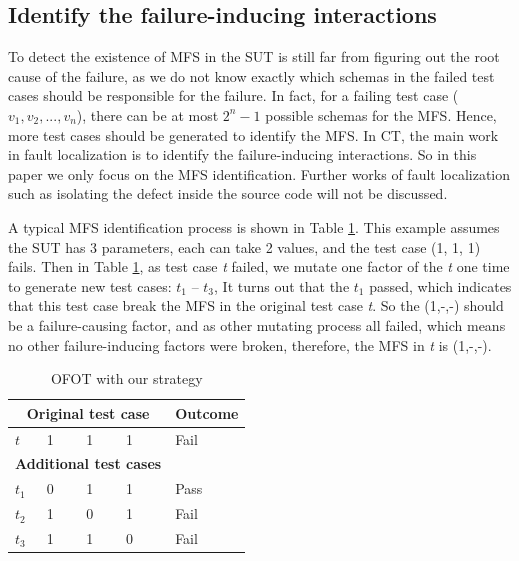 \documentclass{sig-alternate}
\begin{document}
%

%
%
%


\subsection{Identify the failure-inducing interactions}
To detect the existence of MFS in the SUT is still far from figuring out the root cause of the failure, as we do not know exactly which schemas in the failed test cases should be responsible for the failure. In fact, for a failing test case ($v_{1},v_{2},...,v_{n}$), there can be at most $2^{n} - 1$ possible schemas for the MFS. Hence, more test cases should be generated to identify the MFS. In CT, the main work in fault localization is to identify the failure-inducing interactions. So in this paper we only focus on the MFS identification. Further works of fault localization such as isolating the defect inside the source code will not be discussed.

A typical MFS identification process is shown in Table \ref{ofot-identify}. This example assumes the SUT has 3 parameters, each can take 2 values, and the test case (1, 1, 1) fails. Then in Table \ref{ofot-identify}, as test case \emph{t} failed, we mutate one factor of the \emph{t} one time to generate new test cases: $t_{1}$ -- $t_{3}$, It turns out that the $t_{1}$ passed, which indicates that this test case break the MFS in the original test case \emph{t}. So the (1,-,-) should be a failure-causing factor, and as other mutating process all failed, which means no other failure-inducing factors were broken, therefore, the MFS in \emph{t} is (1,-,-).

\begin{table}[h]
\caption{OFOT with our strategy}
\label{ofot-identify}
\center
\begin{tabular}{llllll}
 \hline
\multicolumn{5}{c}{\bfseries Original test case} & \bfseries Outcome \\  \hline
 $t$ & \multicolumn{4}{l}{1 \ \ \ \ 1 \ \ \ \  1 } & Fail \\
 \hline
\multicolumn{5}{c}{\bfseries Additional  test cases} &  \\  \hline
$t_{1}$ &\multicolumn{4}{l}{0  \ \ \ \  1 \ \ \ \  1 }& Pass \\
$t_{2}$ &\multicolumn{4}{l}{1  \ \ \ \  0 \ \ \ \  1 } & Fail \\
$t_{3}$ &\multicolumn{4}{l}{1  \ \ \ \  1 \ \ \ \  0 } & Fail \\
 \hline
\end{tabular}
\end{table}
\end{document}
